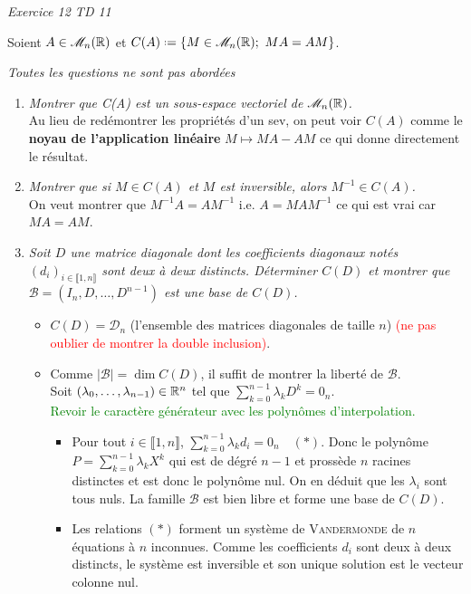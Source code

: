 \emph{Exercice 12 TD 11}

\begin{defi}
    Soient $A \in \mathscr{M}_n(\mathbb{R})$ et $C(A) \defeq \{ M \in \M_n(\R);\ MA = AM \}$.
\end{defi}

\emph{Toutes les questions ne sont pas abordées}

\begin{enumerate}
    \item \emph{Montrer que C(A) est un sous-espace vectoriel de $\mathscr{M}_n(\mathbb{R})$.} \\
    Au lieu de redémontrer les propriétés d'un sev, on peut voir $C(A)$ comme le \textbf{noyau de l'application linéaire} $M \mapsto MA - AM$ ce qui donne directement le résultat. 
    \item \emph{Montrer que si $M \in C(A)$ et $M$ est inversible, alors $M^{-1} \in C(A)$.} \\
    On veut montrer que $M^{-1} A = A M^{-1}$ i.e. $A = M A M^{-1}$ ce qui est vrai car $M A = A M$.
    \item \emph{Soit $D$ une matrice diagonale dont les coefficients diagonaux notés $(d_i)_{i \in \llbracket 1, n \rrbracket}$ sont deux à deux distincts. Déterminer $C(D)$ et montrer que $\mathscr{B} = (I_n, D, \dots, D^{n-1})$ est une base de $C(D)$.}
    \begin{itemize}
        \item $C(D) = \mathscr{D}_n$ (l'ensemble des matrices diagonales de taille $n$) \textcolor{red}{(ne pas oublier de montrer la double inclusion)}.
        \item Comme $| \mathscr{B} | = \dim C(D)$, il suffit de montrer la liberté de $\mathscr{B}$. \\
        Soit $(\lambda_0, \dots, \lambda_{n-1}) \in \mathbb{R}^n$ tel que $\sum\limits_{k=0}^{n-1} \lambda_k D^k = 0_n$. \\
        \textcolor{green}{Revoir le caractère générateur avec les polynômes d'interpolation.}
        \begin{itemize}
            \item Pour tout $i \in \llbracket 1, n \rrbracket$, $\sum\limits_{k=0}^{n-1} \lambda_k d_i = 0_n \quad (*)$. Donc le polynôme $P = \sum\limits_{k=0}^{n-1} \lambda_k X^k$ qui est de dégré $n-1$ et prossède $n$ racines distinctes et est donc le polynôme nul. On en déduit que les $\lambda_i$ sont tous nuls. La famille $\mathscr{B}$ est bien libre et forme une base de $C(D)$.
            \item Les relations $(*)$ forment un système de \textsc{Vandermonde} de $n$ équations à $n$ inconnues. Comme les coefficients $d_i$ sont deux à deux distincts, le système est inversible et son unique solution est le vecteur colonne nul.

\end{itemize}
\end{itemize}
\end{enumerate}
